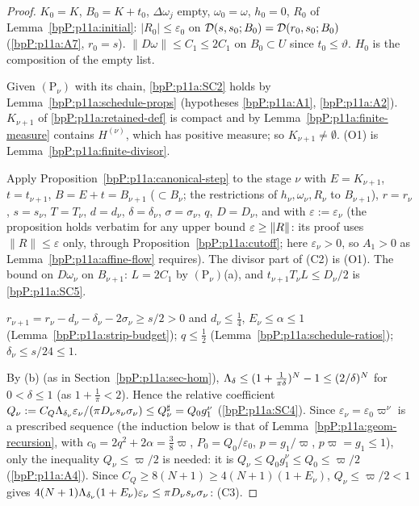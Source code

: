 \begin{proof}
\label{stepP:p11a:il-p0} $K_0=K$, $B_0=K+t_0$, $\Delta\omega_j$ empty, $\omega_0=\omega$, $h_0=0$, $R_0$ of Lemma~\ref{bpP:p11a:initial}: $\lvert R_0\rvert\le\varepsilon_0$ on $\mathcal D(s,s_0;B_0)=\mathcal D(r_0,s_0;B_0)$ (\ref{bpP:p11a:A7}, $r_0=s$). $\lVert D\omega\rVert\le C_1\le2C_1$ on $B_0\subset U$ since $t_0\le\vartheta$. $H_0$ is the composition of the empty list.

\label{stepP:p11a:il-ret} Given $(\mathrm P_\nu)$ with its chain, \ref{bpP:p11a:SC2} holds by Lemma~\ref{bpP:p11a:schedule-props} (hypotheses \ref{bpP:p11a:A1}, \ref{bpP:p11a:A2}). $K_{\nu+1}$ of \eqref{bpP:p11a:retained-def} is compact and by Lemma~\ref{bpP:p11a:finite-measure} contains $H^{(\nu)}$, which has positive measure; so $K_{\nu+1}\neq\emptyset$. (O1) is Lemma~\ref{bpP:p11a:finite-divisor}.

\label{stepP:p11a:il-c2} Apply Proposition~\ref{bpP:p11a:canonical-step} to the stage $\nu$ with $E=K_{\nu+1}$, $t=t_{\nu+1}$, $B=E+t=B_{\nu+1}$ ($\subset B_\nu$; the restrictions of $h_\nu,\omega_\nu,R_\nu$ to $B_{\nu+1}$), $r=r_\nu$, $s=s_\nu$, $T=T_\nu$, $d=d_\nu$, $\delta=\delta_\nu$, $\sigma=\sigma_\nu$, $q$, $D=D_\nu$, and with $\varepsilon:=\varepsilon_\nu$ (the proposition holds verbatim for any upper bound $\varepsilon\ge\lVert R\rVert_{}$: its proof uses $\lVert R\rVert\le\varepsilon$ only, through Proposition~\ref{bpP:p11a:cutoff}; here $\varepsilon_\nu>0$, so $A_1>0$ as Lemma~\ref{bpP:p11a:affine-flow} requires). The divisor part of (C2) is (O1). The bound on $D\omega_\nu$ on $B_{\nu+1}$: $L=2C_1$ by $(\mathrm P_\nu)$(a), and $t_{\nu+1}T_\nu L\le D_\nu/2$ is \ref{bpP:p11a:SC5}.

\label{stepP:p11a:il-c1} $r_{\nu+1}=r_\nu-d_\nu-\delta_\nu-2\sigma_\nu\ge s/2>0$ and $d_\nu\le\frac14$, $E_\nu\le\alpha\le1$ (Lemma~\ref{bpP:p11a:strip-budget}); $q\le\frac12$ (Lemma~\ref{bpP:p11a:schedule-ratios}); $\delta_\nu\le s/24\le1$.

\label{stepP:p11a:il-c3} By (b) (as in Section~\ref{bpP:p11a:sec-hom}), $\Lambda_{\delta}\le(1+\frac1{\pi\delta})^N-1\le(2/\delta)^N$ for $0<\delta\le1$ (as $1+\frac1\pi<2$). Hence the relative coefficient $Q_\nu:=C_Q\Lambda_{\delta_\nu}\varepsilon_\nu/(\pi D_\nu s_\nu\sigma_\nu)\le Q^\sharp_\nu=Q_0g_1^\nu$ (\ref{bpP:p11a:SC4}). Since $\varepsilon_\nu=\varepsilon_0\varpi^\nu$ is a prescribed sequence (the induction below is that of Lemma~\ref{bpP:p11a:geom-recursion}, with $c_0=2q^2+2\alpha=\frac38\varpi$, $P_0=Q_0/\varepsilon_0$, $p=g_1/\varpi$, $p\varpi=g_1\le1$), only the inequality $Q_\nu\le\varpi/2$ is needed: it is $Q_\nu\le Q_0g_1^\nu\le Q_0\le\varpi/2$ (\ref{bpP:p11a:A4}). Since $C_Q\ge8(N+1)\ge4(N+1)(1+E_\nu)$, $Q_\nu\le\varpi/2<1$ gives $4(N+1)\Lambda_{\delta_\nu}(1+E_\nu)\varepsilon_\nu\le\pi D_\nu s_\nu\sigma_\nu$: (C3).


\end{proof}
